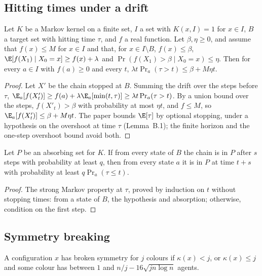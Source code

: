 \subsection{Hitting times under a drift}

\begin{lemma}\label{lem:mo-drift}
\leanok
Let $K$ be a Markov kernel on a finite set, $I$ a set with $K(x,I)=1$ for $x\in I$, $B$ a target
set with hitting time $\tau$, and $f$ a real function. Let $\beta,\eta\ge0$, and assume that
$f(x)\le M$ for $x\in I$ and that, for $x\in I\setminus B$, $f(x)\le\beta$,
$\E[f(X_1)\mid X_0=x]\ge f(x)+\lambda$ and $\Pr(f(X_1)>\beta\mid X_0=x)\le\eta$. Then for every
$a\in I$ with $f(a)\ge0$ and every $t$, $\lambda t\Pr_a(\tau>t)\le\beta+M\eta t$.
\end{lemma}
\begin{proof}\leanok
Let $X'$ be the chain stopped at $B$. Summing the drift over the steps before $\tau$,
$\E_a[f(X'_t)]\ge f(a)+\lambda\E_a[\min(t,\tau)]\ge\lambda t\Pr_a(\tau>t)$. By a union bound over
the steps, $f(X'_t)>\beta$ with probability at most $\eta t$, and $f\le M$, so
$\E_a[f(X'_t)]\le\beta+M\eta t$. The paper bounds $\E[\tau]$ by optional stopping, under a
hypothesis on the overshoot at time $\tau$ (Lemma~B.1); the finite horizon and the one-step
overshoot bound avoid both.
\end{proof}

\begin{lemma}\label{lem:mo-strong-markov}
\leanok
Let $P$ be an absorbing set for $K$. If from every state of $B$ the chain is in $P$ after $s$
steps with probability at least $q$, then from every state $a$ it is in $P$ at time $t+s$ with
probability at least $q\Pr_a(\tau\le t)$.
\end{lemma}
\begin{proof}\leanok
The strong Markov property at $\tau$, proved by induction on $t$ without stopping times: from a
state of $B$, the hypothesis and absorption; otherwise, condition on the first step.
\end{proof}

\subsection{Symmetry breaking}

\begin{definition}\label{def:mo-broken}
\leanok
{}
A configuration $x$ has broken symmetry for $j$ colours if $\kappa(x)<j$, or $\kappa(x)\le j$ and
some colour has between $1$ and $n/j-16\sqrt{jn\log n}$ agents.
\end{definition}

